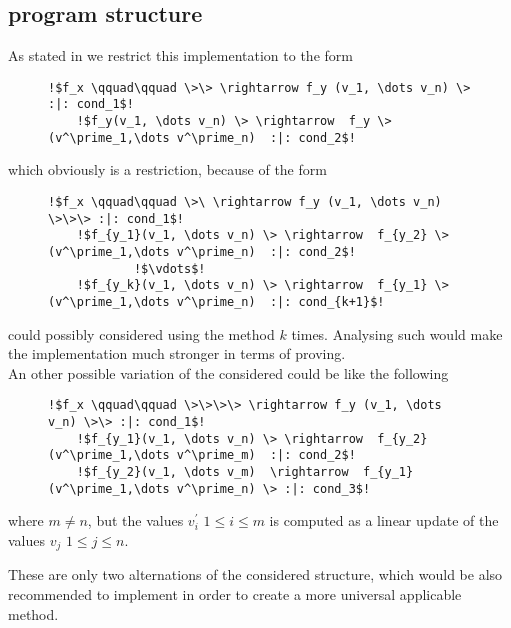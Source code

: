 \subsection{\its program structure}
\label{sec:structure-improvement}
As stated in  we restrict this implementation to the form 
\begin{figure}[H]
	\begin{lstlisting}[escapechar=!]
	!$f_x \qquad\qquad \>\> \rightarrow f_y (v_1, \dots v_n) \> :|: cond_1$!
	!$f_y(v_1, \dots v_n) \> \rightarrow  f_y \>(v^\prime_1,\dots v^\prime_n)  :|: cond_2$!
	\end{lstlisting}
\end{figure}
which obviously is a restriction, because \itss of the form
\begin{figure}[H]
	\begin{lstlisting}[escapechar=!]
	!$f_x \qquad\qquad \>\ \rightarrow f_y (v_1, \dots v_n) \>\>\> :|: cond_1$!
	!$f_{y_1}(v_1, \dots v_n) \> \rightarrow  f_{y_2} \>(v^\prime_1,\dots v^\prime_n)  :|: cond_2$!
			!$\vdots$!
	!$f_{y_k}(v_1, \dots v_n) \> \rightarrow  f_{y_1} \>(v^\prime_1,\dots v^\prime_n)  :|: cond_{k+1}$!
	\end{lstlisting}
\end{figure}
could possibly considered using the method $k$ times. Analysing such \its would make the implementation much stronger in terms of proving.
\\
An other possible variation of the considered \its could be like the following
\begin{figure}[H]
	\begin{lstlisting}[escapechar=!]
	!$f_x \qquad\qquad \>\>\>\> \rightarrow f_y (v_1, \dots v_n) \>\> :|: cond_1$!
	!$f_{y_1}(v_1, \dots v_n) \> \rightarrow  f_{y_2} (v^\prime_1,\dots v^\prime_m)  :|: cond_2$!
	!$f_{y_2}(v_1, \dots v_m)  \rightarrow  f_{y_1} (v^\prime_1,\dots v^\prime_n) \> :|: cond_3$!
	\end{lstlisting}
\end{figure}
where $m \ne n$, but the values $v^\prime_i$ $1 \le i \le m$ is computed as a linear update of the values $v_j$ $1 \le j \le n$.

These are only two alternations of the considered structure, which would be also recommended to implement in order to create a more universal applicable method.

